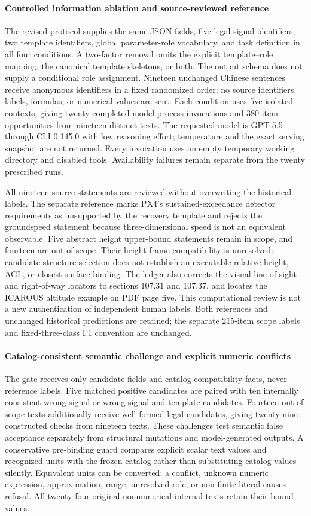\paragraph{Controlled information ablation and source-reviewed reference}
The revised protocol supplies the same JSON fields, five legal signal identifiers, two template identifiers, global parameter-role vocabulary, and task definition in all four conditions. A two-factor removal omits the explicit template--role mapping, the canonical template skeletons, or both. The output schema does not supply a conditional role assignment. Nineteen unchanged Chinese sentences receive anonymous identifiers in a fixed randomized order; no source identifiers, labels, formulas, or numerical values are sent. Each condition uses five isolated contexts, giving twenty completed model-process invocations and 380 item opportunities from nineteen distinct texts. The requested model is GPT-5.5 through CLI 0.145.0 with low reasoning effort; temperature and the exact serving snapshot are not returned. Every invocation uses an empty temporary working directory and disabled tools. Availability failures remain separate from the twenty prescribed runs.

All nineteen source statements are reviewed without overwriting the historical labels. The separate reference marks PX4's sustained-exceedance detector requirements as unsupported by the recovery template and rejects the groundspeed statement because three-dimensional speed is not an equivalent observable. Five abstract height upper-bound statements remain in scope, and fourteen are out of scope. Their height-frame compatibility is unresolved: candidate structure selection does not establish an executable relative-height, AGL, or closest-surface binding. The ledger also corrects the visual-line-of-sight and right-of-way locators to sections 107.31 and 107.37, and locates the ICAROUS altitude example on PDF page five. This computational review is not a new authentication of independent human labels. Both references and unchanged historical predictions are retained; the separate 215-item scope labels and fixed-three-class F1 convention are unchanged.

\paragraph{Catalog-consistent semantic challenge and explicit numeric conflicts}
The gate receives only candidate fields and catalog compatibility facts, never reference labels. Five matched positive candidates are paired with ten internally consistent wrong-signal or wrong-signal-and-template candidates. Fourteen out-of-scope texts additionally receive well-formed legal candidates, giving twenty-nine constructed checks from nineteen texts. These challenges test semantic false acceptance separately from structural mutations and model-generated outputs. A conservative pre-binding guard compares explicit scalar text values and recognized units with the frozen catalog rather than substituting catalog values silently. Equivalent units can be converted; a conflict, unknown numeric expression, approximation, range, unresolved role, or non-finite literal causes refusal. All twenty-four original nonnumerical internal texts retain their bound values.
